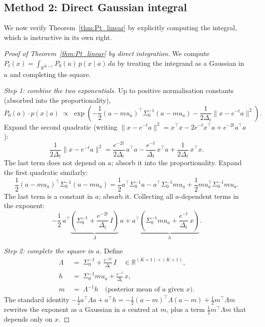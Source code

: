 \documentclass[12pt, a4paper]{article}
\def\ba{a}%
\def\bx{x}%
\def\bmu{mu}%
\def\bm#1{#1}%
\theoremstyle{definition}
\newcommand{\R}{\mathbb{R}}
\newcommand{\ba}{\bm{a}}
\newcommand{\bx}{\bm{x}}
\newcommand{\bmu}{\bm{\mu}}
\newcommand{\dt}{\Delta_t}
\begin{document}
\subsection{Method 2: Direct Gaussian integral}

We now verify Theorem~\ref{thm:Pt_linear} by explicitly computing
the integral, which is instructive in its own right.

\begin{proof}[Proof of Theorem~\ref{thm:Pt_linear} by direct integration]
We compute $P_t(\bx) = \int_{\R^{K+1}} P_0(\ba)\,p(\bx\mid\ba)\,d\ba$
by treating the integrand as a Gaussian in $\ba$ and completing the square.

\medskip
\noindent\textit{Step 1: combine the two exponentials.}
Up to positive normalisation constants (absorbed into the proportionality),
\[
  P_0(\ba)\cdot p(\bx\mid\ba)
  \;\propto\;
  \exp\!\left(
    -\frac{1}{2}(\ba-\bmu_a)^\top\Sigma_0^{-1}(\ba-\bmu_a)
    -\frac{1}{2\dt}\|\bx - e^{-t}\ba\|^2
  \right).
\]
Expand the second quadratic (writing $\|\bx - e^{-t}\ba\|^2 =
\bx^\top\bx - 2e^{-t}\bx^\top\ba + e^{-2t}\ba^\top\ba$):
\[
  \frac{1}{2\dt}\|\bx - e^{-t}\ba\|^2
  = \frac{e^{-2t}}{2\dt}\,\ba^\top\ba
    - \frac{e^{-t}}{\dt}\,\bx^\top\ba
    + \frac{1}{2\dt}\,\bx^\top\bx.
\]
The last term does not depend on $\ba$; absorb it into the proportionality.
Expand the first quadratic similarly:
\[
  \frac{1}{2}(\ba-\bmu_a)^\top\Sigma_0^{-1}(\ba-\bmu_a)
  = \frac{1}{2}\ba^\top\Sigma_0^{-1}\ba
    - \ba^\top\Sigma_0^{-1}\bmu_a
    + \frac{1}{2}\bmu_a^\top\Sigma_0^{-1}\bmu_a.
\]
The last term is a constant in $\ba$; absorb it. Collecting all $\ba$-dependent
terms in the exponent:
\[
  -\frac{1}{2}\,\ba^\top
    \underbrace{\left(\Sigma_0^{-1} + \frac{e^{-2t}}{\dt}\,I\right)}_{\Lambda}\,\ba
  + \ba^\top
    \underbrace{\left(\Sigma_0^{-1}\bmu_a + \frac{e^{-t}}{\dt}\,\bx\right)}_{\bm{h}}.
\]

\medskip
\noindent\textit{Step 2: complete the square in $\ba$.}
Define
\begin{align*}
  \Lambda &\;=\; \Sigma_0^{-1} + \frac{e^{-2t}}{\dt}\,I
  \quad\in\R^{(K+1)\times(K+1)},\\
  \bm{h} &\;=\; \Sigma_0^{-1}\bmu_a + \frac{e^{-t}}{\dt}\,\bx,\\
  \bm{m} &\;=\; \Lambda^{-1}\bm{h}
  \quad\text{(posterior mean of $\ba$ given $\bx$)}.
\end{align*}
The standard identity $-\frac{1}{2}\ba^\top\Lambda\ba + \ba^\top\bm{h}
= -\frac{1}{2}(\ba-\bm{m})^\top\Lambda(\ba-\bm{m})
+ \frac{1}{2}\bm{m}^\top\Lambda\bm{m}$
rewrites the exponent as a Gaussian in $\ba$ centred at $\bm{m}$,
plus a term $\frac{1}{2}\bm{m}^\top\Lambda\bm{m}$ that depends only on $\bx$.


\end{proof}
\end{document}
